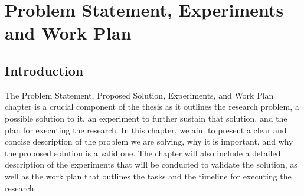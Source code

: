     
\chapter{Problem Statement, Experiments and Work Plan}

\section{Introduction}
The Problem Statement, Proposed Solution, Experiments, and Work Plan chapter is a crucial component of the thesis as it outlines the research problem, a possible solution to it, an experiment to further sustain that solution, and the plan for executing the research. In this chapter, we aim to present a clear and concise description of the problem we are solving, why it is important, and why the proposed solution is a valid one. The chapter will also include a detailed description of the experiments that will be conducted to validate the solution, as well as the work plan that outlines the tasks and the timeline for executing the research.

